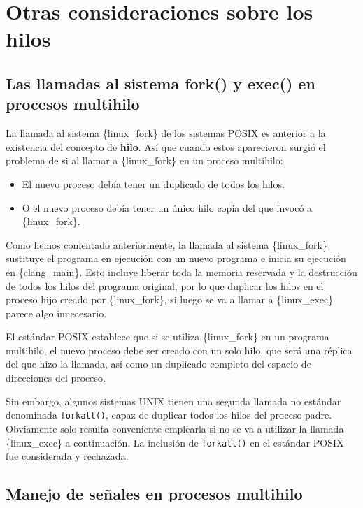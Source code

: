 \section{Otras consideraciones sobre los
hilos}\label{_otras_consideraciones_sobre_los_hilos}

\subsection{Las llamadas al sistema fork() y exec() en procesos
multihilo}\label{_las_llamadas_al_sistema_fork_y_exec_en_procesos_multihilo}

La llamada al sistema \{linux\_fork\} de los sistemas POSIX es anterior
a la existencia del concepto de \textbf{hilo}. Así que cuando estos
aparecieron surgió el problema de si al llamar a \{linux\_fork\} en un
proceso multihilo:

\begin{itemize}
\item
  El nuevo proceso debía tener un duplicado de todos los hilos.
\item
  O el nuevo proceso debía tener un único hilo copia del que invocó a
  \{linux\_fork\}.
\end{itemize}

Como hemos comentado anteriormente, la llamada al sistema
\{linux\_fork\} sustituye el programa en ejecución con un nuevo programa
e inicia su ejecución en \{clang\_main\}. Esto incluye liberar toda la
memoria reservada y la destrucción de todos los hilos del programa
original, por lo que duplicar los hilos en el proceso hijo creado por
\{linux\_fork\}, si luego se va a llamar a \{linux\_exec\} parece algo
innecesario.

El estándar POSIX establece que si se utiliza \{linux\_fork\} en un
programa multihilo, el nuevo proceso debe ser creado con un solo hilo,
que será una réplica del que hizo la llamada, así como un duplicado
completo del espacio de direcciones del proceso.

Sin embargo, algunos sistemas UNIX tienen una segunda llamada no
estándar denominada \texttt{forkall()}, capaz de duplicar todos los
hilos del proceso padre. Obviamente solo resulta conveniente emplearla
si no se va a utilizar la llamada \{linux\_exec\} a continuación. La
inclusión de \texttt{forkall()} en el estándar POSIX fue considerada y
rechazada.

\subsection{Manejo de señales en procesos
multihilo}\label{_manejo_de_seuxf1ales_en_procesos_multihilo}

